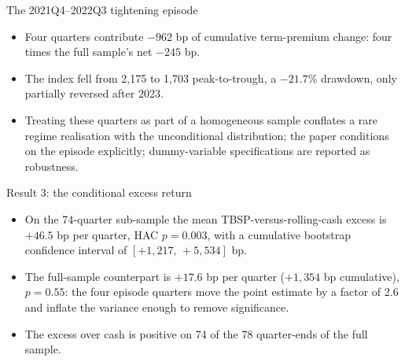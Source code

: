 \documentclass[aspectratio=169,11pt]{beamer}
\begin{document}
\begin{frame}{The 2021Q4--2022Q3 tightening episode}
  \begin{itemize}
    \item Four quarters contribute $-962$ bp of cumulative term-premium
          change: four times the full sample's net $-245$ bp.
    \item The index fell from 2{,}175 to 1{,}703 peak-to-trough, a $-21.7\%$
          drawdown, only partially reversed after 2023.
    \item Treating these quarters as part of a homogeneous sample conflates a
          rare regime realisation with the unconditional distribution; the
          paper conditions on the episode explicitly; dummy-variable
          specifications are reported as robustness.
  \end{itemize}
\end{frame}

\begin{frame}{Result 3: the conditional excess return}
  \begin{itemize}
    \item On the 74-quarter sub-sample the mean TBSP-versus-rolling-cash
          excess is $+46.5$ bp per quarter, HAC $p=0.003$, with a cumulative
          bootstrap confidence interval of $[+1{,}217,\,+5{,}534]$ bp.
    \item The full-sample counterpart is $+17.6$ bp per quarter
          ($+1{,}354$ bp cumulative), $p=0.55$: the four episode quarters move
          the point estimate by a factor of 2.6 and inflate the variance
          enough to remove significance.
    \item The excess over cash is positive on 74 of the 78 quarter-ends of the
          full sample.
  \end{itemize}
\end{frame}
\end{document}

